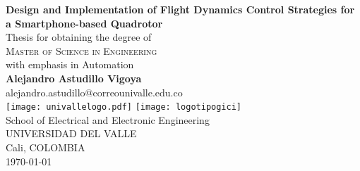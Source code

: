 \begin{titlepage}
\begin{center}
 {\LARGE\bfseries Design and Implementation of Flight Dynamics Control Strategies for a Smartphone-based Quadrotor\\}
 \vspace{2.5cm}
{Thesis for obtaining the degree of} \\[2cm]
\textsc{\Large{{Master of Science in Engineering}}} \\[5pt]
{\large  with emphasis in Automation} \\[2pt]
 \vfill
 \vspace{0.5cm}
 \vspace{1.5cm}
 {\Large\bfseries Alejandro Astudillo Vigoya}\\[5pt]
 alejandro.astudillo@correounivalle.edu.co\\[14pt]
 \vspace{1.5cm}
\texttt{[image: univallelogo.pdf]}
\texttt{[image: logotipogici]}
\\[35pt]
{School of Electrical and Electronic Engineering}\\[5pt]
{UNIVERSIDAD DEL VALLE}\\[5pt]
{Cali, COLOMBIA}\\
 \vfill
 \vspace{0.5cm}
{\today} %
\end{center}
\end{titlepage}

\setcounter{page}{2} 

\newpage
\thispagestyle{empty}
\mbox{}


